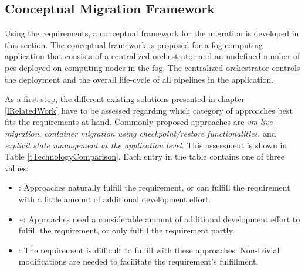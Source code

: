 \subsection{Conceptual Migration Framework}
\label{lMigrationConcept}
Using the requirements, a conceptual framework for the migration is developed in this section. The conceptual framework is proposed for a fog computing application that consists of a centralized orchestrator and an undefined number of \gls{pe}s deployed on computing nodes in the fog. The centralized orchestrator controls the deployment and the overall life-cycle of all pipelines in the application.\par %
As a first step, the different existing solutions presented in chapter \ref{lRelatedWork} have to be assessed regarding which category of approaches best fits the requirements at hand. Commonly proposed approaches are \textit{\gls{vm} live migration}, \textit{container migration using checkpoint/restore functionalities}, and \textit{explicit state management at the application level}. This assessment is shown in Table \ref{tTechnologyComparison}. Each entry in the table contains one of three values:\\

\begin{itemize}
    \item \checkmark: Approaches naturally fulfill the requirement, or can fulfill the requirement with a little amount of additional development effort.
    \item \textbf{\textasciitilde}: Approaches need a considerable amount of additional development effort to fulfill the requirement, or only fulfill the requirement partly.
    \item {}: The requirement is difficult to fulfill with these approaches. Non-trivial modifications are needed to facilitate the requirement's fulfillment.
\end{itemize}



